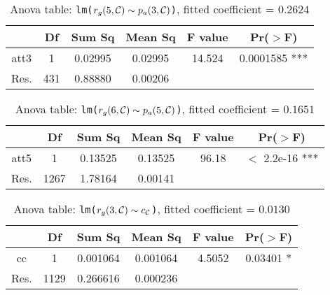 \begin{table}
\caption{Anova table: \texttt{lm($r_g(5,\mathcal{C}) \sim p_a(3,\mathcal{C})$)}, fitted coefficient = $0.2624$}
\begin{center}
\begin{tabular}{c|c|c|c|c|c}
         &   {\small Df}  &  {\small Sum Sq} &  {\small Mean Sq }&  {\small F value} &   {\small  Pr($>$F)}    \\ \hline
 {\small att3}  &     {\small 1} &  {\small 0.02995} &  {\small 0.02995} & {\small  14.524 }& {\small  0.0001585 ***}\\ \hline
 {\small Res.} &  {\small 431} &  {\small 0.88880 }& {\small  0.00206} &            
\end{tabular}
\end{center}
\label{tb:anova_g5_vs_a3}
\end{table}%


\begin{table}
\caption{Anova table: \texttt{lm($r_g(6,\mathcal{C}) \sim p_a(5,\mathcal{C})$)}, fitted coefficient = $0.1651$}
\begin{center}
\begin{tabular}{c|c|c|c|c|c}
         &   {\small Df } &  {\small Sum Sq} & {\small  Mean Sq} &  {\small F value} &  {\small   Pr($>$F)   } \\ \hline
 {\small att5} &         {\small 1}  & {\small  0.13525 }&  {\small 0.13525 }& {\small   96.18 }&  $<$  {\small 2.2e-16 ***}\\ \hline
 {\small Res.} & {\small 1267 }& {\small 1.78164 }&  {\small 0.00141}     &
\end{tabular}
\end{center}
\label{tb:anova_g6_vs_a5}
\end{table}%


\begin{table}
\caption{Anova table: \texttt{lm($r_g(3,\mathcal{C})\sim c_{\mathcal{C}}$)}, fitted coefficient = $0.0130$}
\begin{center}
\begin{tabular}{c|c|c|c|c|c}
         &   {\small Df}  &  {\small Sum Sq} &  {\small Mean Sq} &  {\small F value} &   {\small  Pr($>$F)}    \\ \hline
 {\small cc    } &       {\small 1 }&  {\small 0.001064 }&  {\small 0.001064 } & {\small  4.5052  }& {\small  0.03401 *}\\ \hline
 {\small Res.} & {\small  1129} &  {\small 0.266616 }&  {\small 0.000236   }              &
\end{tabular}
\end{center}
\label{tb:anova_g3_vs_cc}
\end{table}%


